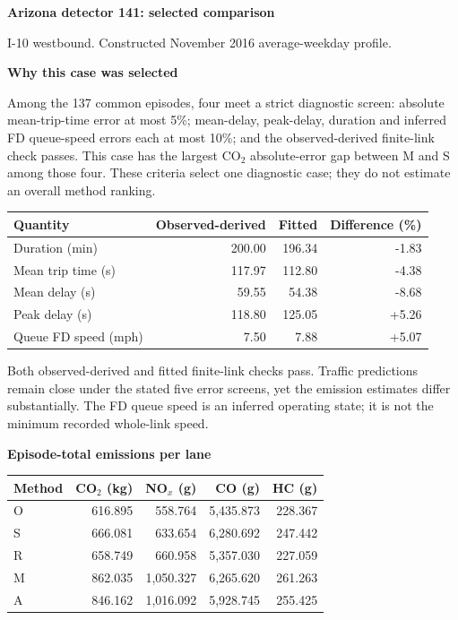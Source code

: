 \documentclass[10pt,a4paper]{article}
\newcommand{\notebox}[1]{\par\vspace{4pt}\begingroup\setlength{\fboxsep}{7pt}\colorbox{pale}{\parbox{\dimexpr\linewidth-14pt\relax}{#1}}\endgroup\par}
\begin{document}
\newpage\fontsize{10}{13}\selectfont
{\fontsize{19}{23}\selectfont\bfseries\color{navy}Arizona detector 141: selected comparison}\par
{\color{muted}I-10 westbound. Constructed November 2016 average-weekday profile.}\par
\vspace{7pt}\textbf{Why this case was selected}\par
Among the 137 common episodes, four meet a strict diagnostic screen: absolute mean-trip-time error at most 5\%; mean-delay, peak-delay, duration and inferred FD queue-speed errors each at most 10\%; and the observed-derived finite-link check passes. This case has the largest CO$_2$ absolute-error gap between M and S among those four. These criteria select one diagnostic case; they do not estimate an overall method ranking.
\vspace{8pt}\par\noindent\begin{tabular*}{\linewidth}{@{\extracolsep{\fill}}lrrr@{}}\toprule
Quantity & Observed-derived & Fitted & Difference (\%)\\\midrule
Duration (min) & 200.00 & 196.34 & -1.83\\\midrule[.3pt]
Mean trip time (s) & 117.97 & 112.80 & -4.38\\\midrule[.3pt]
Mean delay (s) & 59.55 & 54.38 & -8.68\\\midrule[.3pt]
Peak delay (s) & 118.80 & 125.05 & +5.26\\\midrule[.3pt]
Queue FD speed (mph) & 7.50 & 7.88 & +5.07\\\bottomrule\end{tabular*}\par
\notebox{Both observed-derived and fitted finite-link checks pass. Traffic predictions remain close under the stated five error screens, yet the emission estimates differ substantially. The FD queue speed is an inferred operating state; it is not the minimum recorded whole-link speed.}
\vspace{10pt}\textbf{Episode-total emissions per lane}\par
\par\noindent\begin{tabular*}{\linewidth}{@{\extracolsep{\fill}}lrrrr@{}}\toprule
Method & CO$_2$ (kg) & NO$_x$ (g) & CO (g) & HC (g)\\\midrule
O & 616.895 & 558.764 & 5,435.873 & 228.367\\\midrule[.3pt]
S & 666.081 & 633.654 & 6,280.692 & 247.442\\\midrule[.3pt]
R & 658.749 & 660.958 & 5,357.030 & 227.059\\\midrule[.3pt]
M & 862.035 & 1,050.327 & 6,265.620 & 261.263\\\midrule[.3pt]
A & 846.162 & 1,016.092 & 5,928.745 & 255.425\\\bottomrule\end{tabular*}\par
\end{document}
